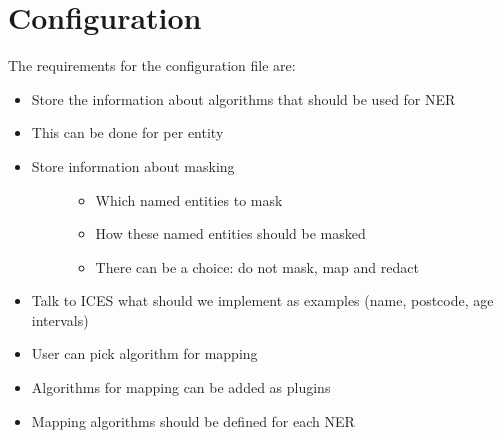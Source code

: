 \documentclass[letterpaper,10pt,english]{sphinxmanual}
\begin{document}
\section{Configuration}
\label{\detokenize{contents:configuration}}
The requirements for the configuration file are:
\begin{itemize}
\item {} 
Store the information about algorithms that should be used for NER

\item {} 
This can be done for per entity

\item {} \begin{description}
\item[{Store information about masking}] \leavevmode\begin{itemize}
\item {} 
Which named entities to mask

\item {} 
How these named entities should be masked

\item {} 
There can be a choice: do not mask, map and redact

\end{itemize}

\end{description}

\item {} 
Talk to ICES what should we implement as examples (name, postcode, age intervals)

\item {} 
User can pick algorithm for mapping

\item {} 
Algorithms for mapping can be added as plugins

\item {} 
Mapping algorithms should be defined for each NER

\end{itemize}
\end{document}
